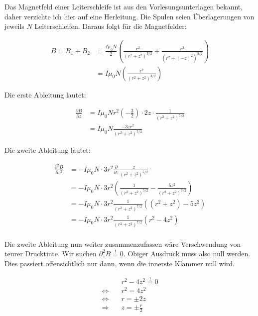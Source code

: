 \documentclass[a4paper,german,12pt,smallheadings]{scrartcl}
\begin{document}
Das Magnetfeld einer Leiterschleife ist aus den Vorlesungsunterlagen bekannt,
daher verzichte ich hier auf eine Herleitung. Die Spulen seien Überlagerungen
von jeweils $N$ Leiterschleifen. Daraus folgt für die Magnetfelder:

\begin{align*}
  B = B_1 + B_2 &= \frac{I\mu_0 N}{2} \left(\frac{r^2}{(r^2 + z^2)^{3/2}} + \frac{r^2}{(r^2 + (-z)^2)^{3/2}}\right) \\
            &= I\mu_0 N \left(\frac{r^2}{(r^2 + z^2)^{3/2}}\right)
\end{align*}

Die erste Ableitung lautet:

\begin{align*}
  \frac{\partial B}{\partial z} &= I\mu_0 N  r^2 \left(-\frac{3}{2}\right) \cdot 2z \cdot \frac{1}{(r^2 + z^2)^{5/2}} \\
                                &= I\mu_0 N \frac{-3zr^2}{(r^2 + z^2)^{5/2}}
\end{align*}

Die zweite Ableitung lautet:

\begin{align*}
  \frac{\partial^2 B}{\partial z^2} &= -I\mu_0 N \cdot 3 r^2 \frac{\partial}{\partial z} \frac{z}{(r^2 + z^2)^{5/2}} \\
                                    &= -I\mu_0 N \cdot 3 r^2 \left(\frac{1}{(r^2 + z^2)^{5/2}} - \frac{5z^2}{(r^2+z^2)^{7/2}}\right) \\
                                    &= -I\mu_0 N \cdot 3 r^2 \frac{1}{(r^2 + z^2)^{7/2}} \left( (r^2+z^2) - 5z^2 \right) \\
                                    &= -I\mu_0 N \cdot 3 r^2 \frac{1}{(r^2 + z^2)^{7/2}} \left( r^2 - 4z^2 \right) \\
\end{align*}

Die zweite Ableitung nun weiter zusammenzufassen wäre Verschwendung von
teurer Drucktinte. Wir suchen $\partial_z^2 B \overset{!}{=} 0$. Obiger Ausdruck
muss also null werden. Dies passiert offensichtlich nur dann, wenn die innerste
Klammer null wird.

\begin{align*}
  &r^2 - 4z^2 \overset{!}{=} 0 \\
  \Leftrightarrow\quad & r^2 = 4z^2 \\
  \Leftrightarrow\quad & r =  \pm 2z \\
  \Rightarrow\quad &z = \pm\frac{r}{2}
\end{align*}
\end{document}
